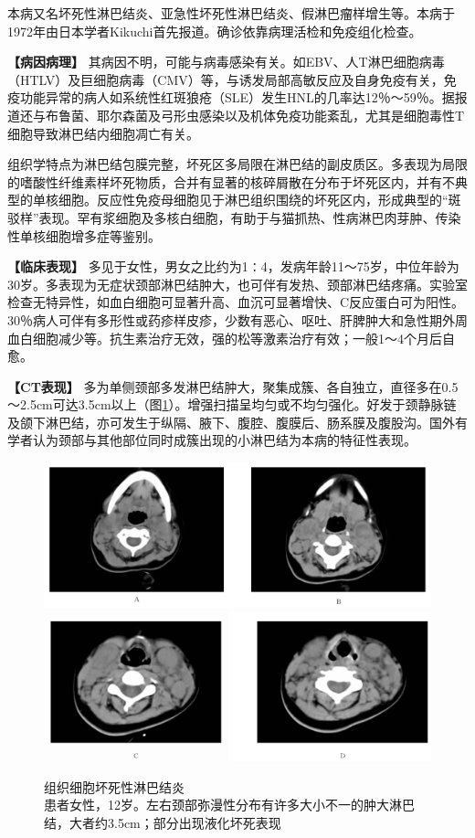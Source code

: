 本病又名坏死性淋巴结炎、亚急性坏死性淋巴结炎、假淋巴瘤样增生等。本病于1972年由日本学者Kikuchi首先报道。确诊依靠病理活检和免疫组化检查。

\textbf{【病因病理】}
其病因不明，可能与病毒感染有关。如EBV、人T淋巴细胞病毒（HTLV）及巨细胞病毒（CMV）等，与诱发局部高敏反应及自身免疫有关，免疫功能异常的病人如系统性红斑狼疮（SLE）发生HNL的几率达12％～59％。据报道还与布鲁菌、耶尔森菌及弓形虫感染以及机体免疫功能紊乱，尤其是细胞毒性T细胞导致淋巴结内细胞凋亡有关。

组织学特点为淋巴结包膜完整，坏死区多局限在淋巴结的副皮质区。多表现为局限的嗜酸性纤维素样坏死物质，合并有显著的核碎屑散在分布于坏死区内，并有不典型的单核细胞。反应性免疫母细胞见于淋巴组织围绕的坏死区内，形成典型的“斑驳样”表现。罕有浆细胞及多核白细胞，有助于与猫抓热、性病淋巴肉芽肿、传染性单核细胞增多症等鉴别。

\textbf{【临床表现】}
多见于女性，男女之比约为1∶4，发病年龄11～75岁，中位年龄为30岁。多表现为无症状颈部淋巴结肿大，也可伴有发热、颈部淋巴结疼痛。实验室检查无特异性，如血白细胞可显著升高、血沉可显著增快、C反应蛋白可为阳性。30％病人可伴有多形性或药疹样皮疹，少数有恶心、呕吐、肝脾肿大和急性期外周血白细胞减少等。抗生素治疗无效，强的松等激素治疗有效；一般1～4个月后自愈。

\textbf{【CT表现】}
多为单侧颈部多发淋巴结肿大，聚集成簇、各自独立，直径多在0.5～2.5cm可达3.5cm以上（图\ref{fig8-7}）。增强扫描呈均匀或不均匀强化。好发于颈静脉链及颌下淋巴结，亦可发生于纵隔、腋下、腹腔、腹膜后、肠系膜及腹股沟。国外有学者认为颈部与其他部位同时成簇出现的小淋巴结为本病的特征性表现。



\begin{figure}[!htbp]
 \centering
 \includegraphics[width=.7\textwidth,height=\textheight,keepaspectratio]{./images/Image00174.jpg}
 \includegraphics[width=.7\textwidth,height=\textheight,keepaspectratio]{./images/Image00175.jpg}
 \captionsetup{justification=centering}
 \caption{组织细胞坏死性淋巴结炎\\{\small 患者女性，12岁。左右颈部弥漫性分布有许多大小不一的肿大淋巴结，大者约3.5cm；部分出现液化坏死表现}}
 \label{fig8-7}
  \end{figure} 

